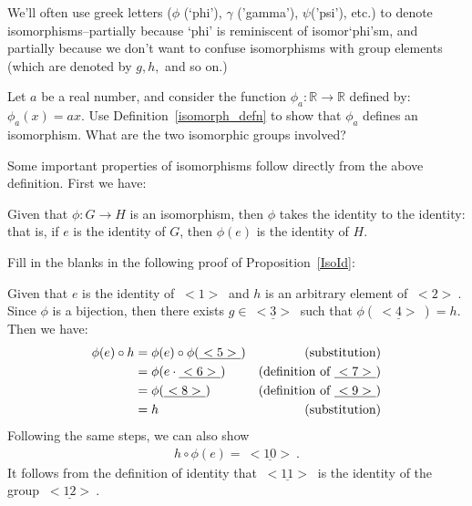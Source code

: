 \begin{rem}
We'll often use greek letters ($\phi$ (`phi'), $\gamma$ ('gamma'), $\psi$('psi'), etc.) to denote isomorphisms--partially because `phi' is reminiscent of isomor`phi'sm, and partially because we don't want to confuse isomorphisms with group elements  (which are denoted by $g,h,$ and so on.)
\end{rem}

\begin{exercise}{}
Let $a$ be a real number, and consider the function $\phi_a : \mathbb{R} \rightarrow \mathbb{R}$ defined by:  $\phi_a(x) = ax$.  Use Definition~\ref{isomorph_defn} to show that $\phi_a$ defines an isomorphism. What are the two isomorphic groups involved?
\end{exercise}

Some important properties of isomorphisms follow directly from the above definition. First we have:

\begin{thm}\label{IsoId}
Given that  $\phi : G \rightarrow H$ is an  isomorphism, then $\phi$ takes the identity to the identity: that is, if $e$ is the identity of $G$, then  $\phi(e)$ is the identity of $H$.
\end{thm}

\begin{exercise}{}
Fill in the blanks in the following proof of Proposition~\ref{IsoId}:
\medskip

\noindent
Given that $e$ is the identity of \underline{$~<1>~$} and $h$ is an arbitrary element of \underline{$~<2>~$}.  Since $\phi$ is a bijection, then there exists $g \in \underline{~<3>~}$ such that $\phi(\underline{~<4>~}) = h$.  Then  we have:
\begin{align*}
\phi(e) \circ h &= \phi(e) \circ \phi(\underline{~<5>~}) & \textrm{(substitution)}\\
&= \phi( e \cdot \underline{~<6>~}) & \textrm{(definition of~} \underline{~<7>~})\\
&= \phi( \underline{~<8>~}) & \textrm{(definition of \underline{$~<9>~$})}\\
&= h & \textrm{(substitution)}
\end{align*}
Following the same steps, we can also show
\begin{align*}
h \circ \phi(e) = \underline{~<10>~}.
\end{align*}
It follows from the definition of identity that $\underline{~<11>~}$ is the identity of the group $\underline{~<12>~}$.
\end{exercise}


